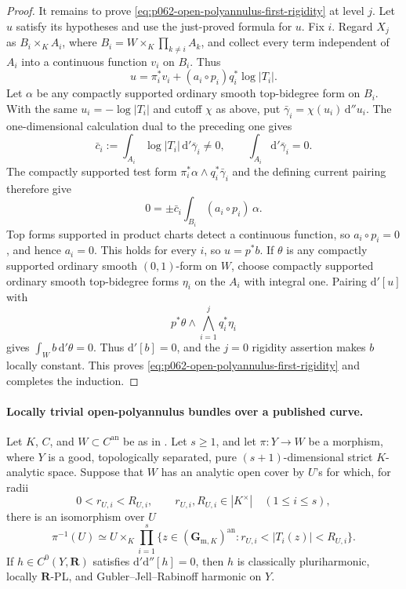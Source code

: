 \begin{proof}
It remains to prove \eqref{eq:p062-open-polyannulus-first-rigidity} at
level \(j\).  Let \(u\) satisfy its hypotheses and use the just-proved
formula for \(u\).  Fix \(i\).  Regard \(X_j\) as
\(B_i\times_KA_i\), where
\(B_i=W\times_K\prod_{k\ne i}A_k\), and collect every term independent of
\(A_i\) into a continuous function \(v_i\) on \(B_i\).  Thus
\[
 u=\pi_i^*v_i+(a_i\circ p_i)q_i^*\log|T_i|.
\]
Let \(\alpha\) be any compactly supported ordinary smooth top-bidegree form
on \(B_i\).  With the same \(u_i=-\log|T_i|\) and cutoff \(\chi\) as above,
put \(\bar\gamma_i=\chi(u_i)\,\mathrm d''u_i\).  The one-dimensional
calculation dual to the preceding one gives
\[
 \bar c_i:=\int_{A_i}\log|T_i|\,\mathrm d'\bar\gamma_i\ne0,
 \qquad\int_{A_i}\mathrm d'\bar\gamma_i=0.
\]
The compactly supported test form
\(\pi_i^*\alpha\wedge q_i^*\bar\gamma_i\) and the defining current
pairing \cite[\S4.4]{CLD25} therefore give
\[
 0=\mathord\pm\bar c_i\int_{B_i}(a_i\circ p_i)\,\alpha.
\]
Top forms supported in product charts detect a continuous function, so
\(a_i\circ p_i=0\), and hence \(a_i=0\).  This holds for every \(i\), so
\(u=p^*b\).  If \(\theta\) is any compactly supported ordinary smooth
\((0,1)\)-form on \(W\), choose compactly supported ordinary smooth
top-bidegree forms \(\eta_i\) on the \(A_i\) with integral one.  Pairing
\(\mathrm d'[u]\) with
\[
                    p^*\theta\wedge\bigwedge_{i=1}^jq_i^*\eta_i
\]
gives \(\int_Wb\,\mathrm d'\theta=0\).  Thus
\(\mathrm d'[b]=0\), and the \(j=0\) rigidity assertion makes \(b\)
locally constant.  This proves \eqref{eq:p062-open-polyannulus-first-rigidity}
and completes the induction.
\end{proof}

\paragraph{Locally trivial open-polyannulus bundles over a published curve.}
\begin{corollary}
\label{cor:p062-open-polyannulus-bundles-over-curves}
Let \(K\), \(C\), and \(W\subset C^{\mathrm{an}}\) be as in
.  Let \(s\geq1\), and let
\(\pi:Y\to W\) be a morphism, where \(Y\) is a good, topologically
separated, pure \((s+1)\)-dimensional strict \(K\)-analytic space.  Suppose
that \(W\) has an analytic open cover by \(U\)'s for which, for radii
\[
       0<r_{U,i}<R_{U,i},
       \qquad r_{U,i},R_{U,i}\in|K^\times|
       \quad(1\leq i\leq s),
\]
there is an isomorphism over \(U\)
\[
 \pi^{-1}(U)\simeq
 U\times_K\prod_{i=1}^s
 \{z\in(\mathbf G_{\mathrm m,K})^{\mathrm{an}}:
                         r_{U,i}<|T_i(z)|<R_{U,i}\}.
\]
If \(h\in C^0(Y,\mathbf R)\) satisfies
\(\mathrm d'\mathrm d''[h]=0\), then \(h\) is classically
pluriharmonic, locally \(\mathbf R\)-PL, and Gubler--Jell--Rabinoff
harmonic on \(Y\).
\end{corollary}

